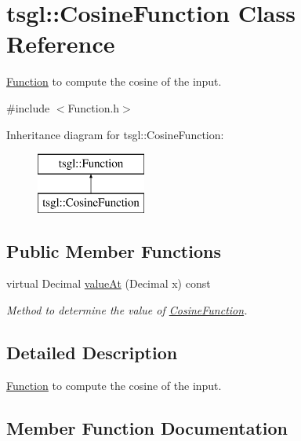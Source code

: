 \hypertarget{classtsgl_1_1_cosine_function}{}\section{tsgl\+:\+:Cosine\+Function Class Reference}
\label{classtsgl_1_1_cosine_function}


\hyperlink{classtsgl_1_1_function}{Function} to compute the cosine of the input.  




{\ttfamily \#include $<$Function.\+h$>$}

Inheritance diagram for tsgl\+:\+:Cosine\+Function\+:\begin{figure}[H]
\begin{center}
\leavevmode
\includegraphics[height=2.000000cm]{classtsgl_1_1_cosine_function}
\end{center}
\end{figure}
\subsection*{Public Member Functions}
\begin{DoxyCompactItemize}
\item 
virtual Decimal \hyperlink{classtsgl_1_1_cosine_function_a2d7841c4f9f77bdd8f5bbc51cbd80bcd}{value\+At} (Decimal x) const
\begin{DoxyCompactList}\small\item\em Method to determine the value of \hyperlink{classtsgl_1_1_cosine_function}{Cosine\+Function}. \end{DoxyCompactList}\end{DoxyCompactItemize}


\subsection{Detailed Description}
\hyperlink{classtsgl_1_1_function}{Function} to compute the cosine of the input. 

\subsection{Member Function Documentation}
\mbox{\label{classtsgl_1_1_cosine_function_a2d7841c4f9f77bdd8f5bbc51cbd80bcd}} 

